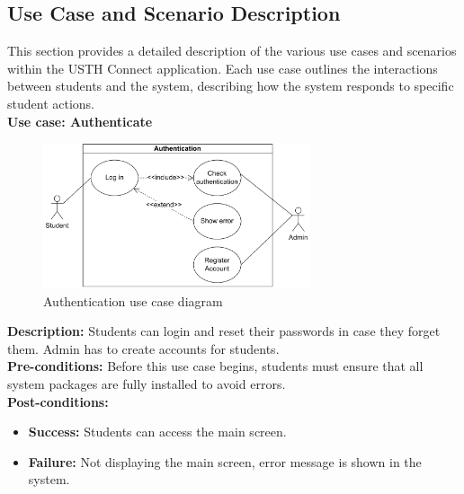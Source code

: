 \documentclass[12pt]{article}
\begin{document}
\subsection{Use Case and Scenario Description}
    This section provides a detailed description of the various use cases and scenarios within the USTH Connect application. 
    Each use case outlines the interactions between students and the system, describing how the system responds to specific student actions. \\
    
\textbf{Use case: Authenticate} \\

    \begin{figure}[H]
        \centering
        \includegraphics[width=0.7\textwidth]{image/AuthenticationUseCase.pdf} 
        \caption{Authentication use case diagram}
        \label{fig:authenticate_use_case}
    \end{figure}
    \textbf{Description:} Students can login and reset their passwords in case they forget them. Admin has to create accounts for students. \\

    \noindent \textbf{Pre-conditions:} Before this use case begins, students must ensure that all system packages are fully installed to avoid errors. \\

    \noindent \textbf{Post-conditions:}
    \begin{itemize}
        \item \textbf{Success:} Students can access the main screen.
        \item \textbf{Failure:} Not displaying the main screen, error message is shown in the system.
    \end{itemize}
\end{document}
